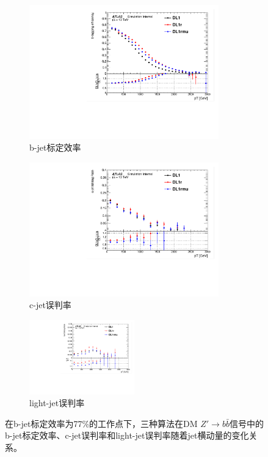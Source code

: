 \begin{figure}[!thbp]
  \begin{subfigure}{.5\textwidth}
  \centering
   \includegraphics[width=0.9\textwidth]{figuresDijet/02-Selection/Zprime/Comparebtageff_Fix77.pdf}
  \caption{b-jet标定效率}
  \end{subfigure}
  \begin{subfigure}{.5\textwidth}
  \centering
   \includegraphics[width=0.9\textwidth]{figuresDijet/02-Selection/Zprime/Comparectageff_Fix77.pdf}
  \caption{c-jet误判率}
  \end{subfigure}
\newline 
  \begin{subfigure}{.99\textwidth}
  \centering
   \includegraphics[width=0.5\textwidth]{figuresDijet/02-Selection/Zprime/Compareltageff_Fix77.pdf}
  \caption{light-jet误判率}
  \end{subfigure}
\caption{
在b-jet标定效率为77\%的工作点下，三种算法在DM $Z\prime\rightarrow b\bar{b}$信号中的b-jet标定效率、c-jet误判率和light-jet误判率随着jet横动量的变化关系。
}
\label{fig:btagperf_zprime_fix77}
\end{figure}



